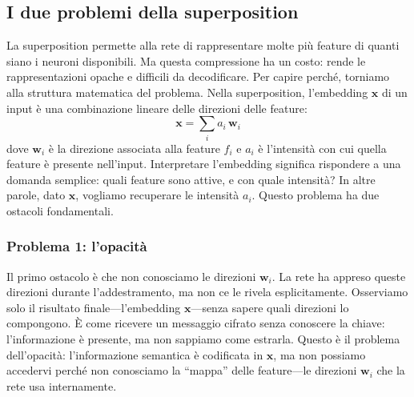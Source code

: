 \subsection{I due problemi della superposition}
\label{subsec:due_problemi}
La superposition permette alla rete di rappresentare molte più feature di quanti siano i neuroni disponibili. Ma questa compressione ha un costo: rende le rappresentazioni opache e difficili da decodificare.
Per capire perché, torniamo alla struttura matematica del problema. Nella superposition, l'embedding $\mathbf{x}$ di un input è una combinazione lineare delle direzioni delle feature:
\begin{equation}
    \mathbf{x} = \sum_i a_i \, \mathbf{w}_i
    \label{eq:linear_superposition}
\end{equation}
dove $\mathbf{w}_i$ è la direzione associata alla feature $f_i$ e $a_i$ è l'intensità con cui quella feature è presente nell'input.
Interpretare l'embedding significa rispondere a una domanda semplice: quali feature sono attive, e con quale intensità? In altre parole, dato $\mathbf{x}$, vogliamo recuperare le intensità $a_i$.
Questo problema ha due ostacoli fondamentali.
\subsubsection{Problema 1: l'opacità}
Il primo ostacolo è che non conosciamo le direzioni $\mathbf{w}_i$.
La rete ha appreso queste direzioni durante l'addestramento, ma non ce le rivela esplicitamente. Osserviamo solo il risultato finale—l'embedding $\mathbf{x}$—senza sapere quali direzioni lo compongono. È come ricevere un messaggio cifrato senza conoscere la chiave: l'informazione è presente, ma non sappiamo come estrarla.
Questo è il problema dell'opacità: l'informazione semantica è codificata in $\mathbf{x}$, ma non possiamo accedervi perché non conosciamo la ``mappa'' delle feature—le direzioni $\mathbf{w}_i$ che la rete usa internamente.
